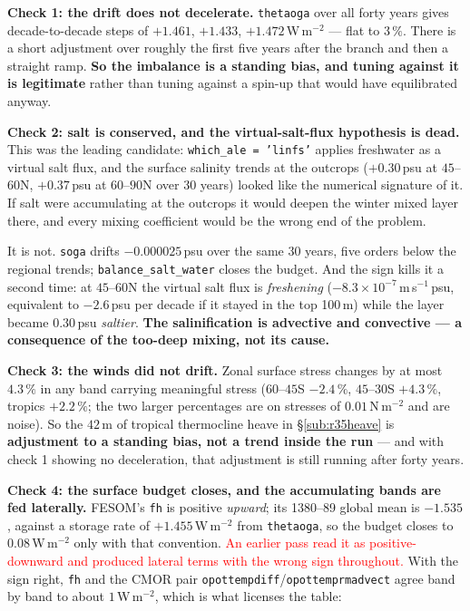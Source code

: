 \documentclass[10pt]{article}
\begin{document}
\textbf{Check 1: the drift does not decelerate.} \texttt{thetaoga} over all forty years
gives decade-to-decade steps of $+1.461$, $+1.433$, $+1.472$\,W\,m$^{-2}$ --- flat to
$3\,\%$. There is a short adjustment over roughly the first five years after the branch and
then a straight ramp. \textbf{So the imbalance is a standing bias, and tuning against it is
legitimate} rather than tuning against a spin-up that would have equilibrated anyway.

\textbf{Check 2: salt is conserved, and the virtual-salt-flux hypothesis is dead.} This was
the leading candidate: \texttt{which\_ale = 'linfs'} applies freshwater as a virtual salt
flux, and the surface salinity trends at the outcrops ($+0.30$\,psu at $45$--$60$N,
$+0.37$\,psu at $60$--$90$N over 30 years) looked like the numerical signature of it. If
salt were accumulating at the outcrops it would deepen the winter mixed layer there, and
every mixing coefficient would be the wrong end of the problem.

It is not. \texttt{soga} drifts $-0.000025$\,psu over the same 30 years, five orders below
the regional trends; \texttt{balance\_salt\_water} closes the budget. And the sign kills it
a second time: at $45$--$60$N the virtual salt flux is \emph{freshening}
($-8.3\times10^{-7}$\,m\,s$^{-1}$\,psu, equivalent to $-2.6$\,psu per decade if it stayed in
the top 100\,m) while the layer became $0.30$\,psu \emph{saltier}. \textbf{The
salinification is advective and convective --- a consequence of the too-deep mixing, not its
cause.}

\textbf{Check 3: the winds did not drift.} Zonal surface stress changes by at most $4.3\,\%$
in any band carrying meaningful stress ($60$--$45$S $-2.4\,\%$, $45$--$30$S $+4.3\,\%$,
tropics $+2.2\,\%$; the two larger percentages are on stresses of $0.01$\,N\,m$^{-2}$ and are
noise). So the $42$\,m of tropical thermocline heave in \S\ref{sub:r35heave} is
\textbf{adjustment to a standing bias, not a trend inside the run} --- and with check 1
showing no deceleration, that adjustment is still running after forty years.

\textbf{Check 4: the surface budget closes, and the accumulating bands are fed laterally.}
FESOM's \texttt{fh} is positive \emph{upward}; its 1380--89 global mean is $-1.535$, against
a storage rate of $+1.455$\,W\,m$^{-2}$ from \texttt{thetaoga}, so the budget closes to
$0.08$\,W\,m$^{-2}$ only with that convention. \textcolor{red}{An earlier pass read it as
positive-downward and produced lateral terms with the wrong sign throughout.} With the sign
right, \texttt{fh} and the CMOR pair \texttt{opottempdiff}/\texttt{opottemprmadvect} agree
band by band to about $1$\,W\,m$^{-2}$, which is what licenses the table:
\end{document}
